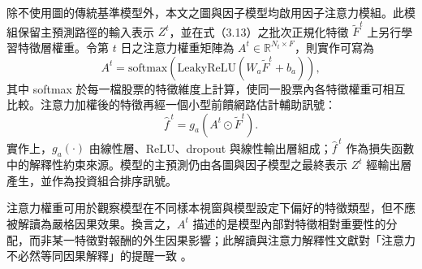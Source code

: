 除不使用圖的傳統基準模型外，本文之圖與因子模型均啟用因子注意力模組。此模組保留主預測路徑的輸入表示 \(Z^t\)，並在式（3.13）之批次正規化特徵 \(\widetilde{F}^{t}\) 上另行學習特徵層權重。令第 \(t\) 日之注意力權重矩陣為 \(A^t\in\mathbb{R}^{N_t\times F}\)，則實作可寫為
\begin{equation}
A^t=\mathrm{softmax}\!\left(\mathrm{LeakyReLU}(W_a\widetilde{F}^{t}+b_a)\right),
\end{equation}
其中 softmax 於每一檔股票的特徵維度上計算，使同一股票內各特徵權重可相互比較。注意力加權後的特徵再經一個小型前饋網路估計輔助訊號：
\begin{equation}
\widehat{f}^{\,t}=g_a\!\left(A^t\odot \widetilde{F}^{t}\right).
\end{equation}
實作上，\(g_a(\cdot)\) 由線性層、ReLU、dropout 與線性輸出層組成；\(\widehat{f}^{\,t}\) 作為損失函數中的解釋性約束來源。模型的主預測仍由各圖與因子模型之最終表示 \(Z^t\) 經輸出層產生，並作為投資組合排序訊號。

注意力權重可用於觀察模型在不同樣本視窗與模型設定下偏好的特徵類型，但不應被解讀為嚴格因果效果。換言之，\(A^t\) 描述的是模型內部對特徵相對重要性的分配，而非某一特徵對報酬的外生因果影響；此解讀與注意力解釋性文獻對「注意力不必然等同因果解釋」的提醒一致 \cite{jain2019attention_not_explanation,serrano2019attention_interpretable}。

